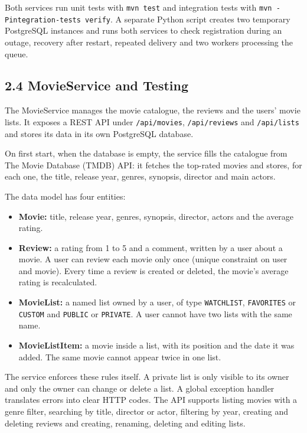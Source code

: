 \documentclass[10pt,a4paper]{article}
\begin{document}
Both services run unit tests with \texttt{mvn test} and integration tests with \texttt{mvn -Pintegration-tests verify}. A separate Python script creates two temporary PostgreSQL instances and runs both services to check registration during an outage, recovery after restart, repeated delivery and two workers processing the queue.

\subsection*{2.4 MovieService and Testing}

The MovieService manages the movie catalogue, the reviews and the users' movie lists. It exposes a REST API under \texttt{/api/movies}, \texttt{/api/reviews} and \texttt{/api/lists} and stores its data in its own PostgreSQL database.

On first start, when the database is empty, the service fills the catalogue from The Movie Database (TMDB) API: it fetches the top-rated movies and stores, for each one, the title, release year, genres, synopsis, director and main actors.

The data model has four entities:
\begin{itemize}
  \item \textbf{Movie:} title, release year, genres, synopsis, director, actors and the average rating.
  \item \textbf{Review:} a rating from 1 to 5 and a comment, written by a user about a movie. A user can review each movie only once (unique constraint on user and movie). Every time a review is created or deleted, the movie's average rating is recalculated.
  \item \textbf{MovieList:} a named list owned by a user, of type \texttt{WATCHLIST}, \texttt{FAVORITES} or \texttt{CUSTOM} and \texttt{PUBLIC} or \texttt{PRIVATE}. A user cannot have two lists with the same name.
  \item \textbf{MovieListItem:} a movie inside a list, with its position and the date it was added. The same movie cannot appear twice in one list.
\end{itemize}

The service enforces these rules itself. A private list is only visible to its owner and only the owner can change or delete a list. A global exception handler translates errors into clear HTTP codes. The API supports listing movies with a genre filter, searching by title, director or actor, filtering by year, creating and deleting reviews and creating, renaming, deleting and editing lists.
\end{document}
